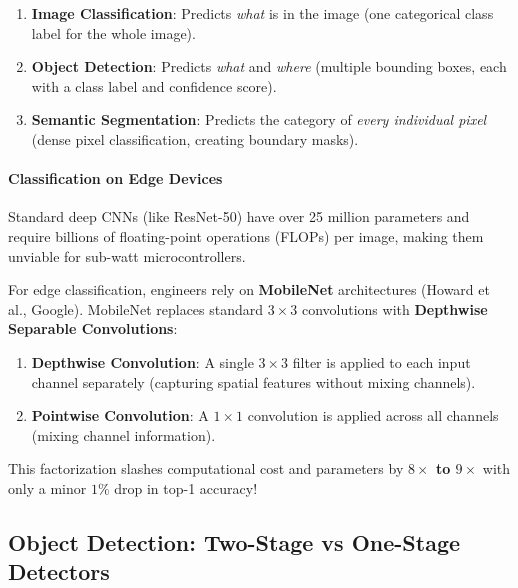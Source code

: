 \begin{keyidea}
\begin{enumerate}
    \item \textbf{Image Classification}: Predicts \emph{what} is in the image (one categorical class label for the whole image).
    \item \textbf{Object Detection}: Predicts \emph{what} and \emph{where} (multiple bounding boxes, each with a class label and confidence score).
    \item \textbf{Semantic Segmentation}: Predicts the category of \emph{every individual pixel} (dense pixel classification, creating boundary masks).
\end{enumerate}
\end{keyidea}

\paragraph{Classification on Edge Devices}
Standard deep CNNs (like ResNet-50) have over 25 million parameters and require billions of floating-point operations (FLOPs) per image, making them unviable for sub-watt microcontrollers. 

For edge classification, engineers rely on \textbf{MobileNet} architectures (Howard et al., Google). MobileNet replaces standard $3 \times 3$ convolutions with \textbf{Depthwise Separable Convolutions}:
\begin{enumerate}
    \item \textbf{Depthwise Convolution}: A single $3 \times 3$ filter is applied to each input channel separately (capturing spatial features without mixing channels).
    \item \textbf{Pointwise Convolution}: A $1 \times 1$ convolution is applied across all channels (mixing channel information).
\end{enumerate}
This factorization slashes computational cost and parameters by \textbf{$8\times$ to $9\times$} with only a minor $1\%$ drop in top-1 accuracy!

\subsection{Object Detection: Two-Stage vs One-Stage Detectors}\label{subsec:detection_paradigms}

